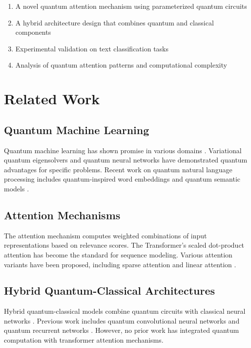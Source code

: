 \documentclass[11pt,twocolumn]{article}
\begin{document}
\begin{enumerate}
    \item A novel quantum attention mechanism using parameterized quantum circuits
    \item A hybrid architecture design that combines quantum and classical components
    \item Experimental validation on text classification tasks
    \item Analysis of quantum attention patterns and computational complexity
\end{enumerate}

\section{Related Work}

\subsection{Quantum Machine Learning}
Quantum machine learning has shown promise in various domains \cite{cerezo2021variational}. Variational quantum eigensolvers \cite{peruzzo2014variational} and quantum neural networks \cite{farhi2018classification} have demonstrated quantum advantages for specific problems. Recent work on quantum natural language processing includes quantum-inspired word embeddings \cite{peters2019quantum} and quantum semantic models \cite{blacoe2013quantum}.

\subsection{Attention Mechanisms}
The attention mechanism \cite{bahdanau2014neural} computes weighted combinations of input representations based on relevance scores. The Transformer's scaled dot-product attention \cite{vaswani2017attention} has become the standard for sequence modeling. Various attention variants have been proposed, including sparse attention \cite{child2019generating} and linear attention \cite{katharopoulos2020transformers}.

\subsection{Hybrid Quantum-Classical Architectures}
Hybrid quantum-classical models combine quantum circuits with classical neural networks \cite{killoran2019continuous}. Previous work includes quantum convolutional neural networks \cite{cong2019quantum} and quantum recurrent networks \cite{chen2020quantum}. However, no prior work has integrated quantum computation with transformer attention mechanisms.
\end{document}
